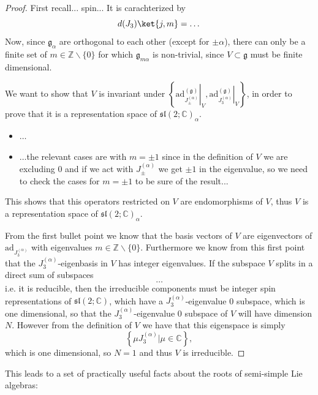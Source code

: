 \begin{proof}
    First recall... spin... It is carachterized by
    \[
        d(J_3)\ket{j,m} = \dots
    \]
    Now, since \(\mathfrak{g}_{\alpha}\) are orthogonal to each other (except for \(\pm \alpha\)), there can only be a finite set of \(m \in \mathbb{Z} \backslash \{0\}\) for which \(\mathfrak{g}_{m \alpha}\) is non-trivial, since \(V \subset \mathfrak{g}\) must be finite dimensional.

    We want to show that \(V\) is invariant under \(\left\{\left. \mathrm{ad}^{(\mathfrak{g})}_{J_\pm^{(\alpha)}}\right|_V , \left. \mathrm{ad}^{(\mathfrak{g})}_{J_3^{(\alpha)}}\right|_V \right\}\), in order to prove that it is a representation space of \(\mathfrak{sl}(2; \mathbb{C})_{\alpha}\).
    \begin{itemize}
        \item \(\dots \)
        \item \(\dots \)the relevant cases are with \(m=\pm 1\) since in the definition of \(V\) we are excluding \(0\) and if we act with \(J_\pm^{(\alpha)}\) we get \(\pm 1\) in the eigenvalue, so we need to check the cases for \(m = \pm 1\) to be sure of the result...
    \end{itemize}
    This shows that this operators restricted on \(V\) are endomorphisms of \(V\), thus \(V\) is a representation space of \(\mathfrak{sl}(2; \mathbb{C})_{\alpha}\).

    From the first bullet point we know that the basis vectors of \(V\) are eigenvectors of \(\mathrm{ad}_{J_3^{(\alpha)}}\) with eigenvalues \(m \in \mathbb{Z} \backslash \{0\}\). Furthermore we know from this first point that the \(J_3^{(\alpha)}\)-eigenbasis in \(V\) has integer eigenvalues. If the subspace \(V\) splits in a direct sum of subspaces
    \[
        \dots
    \]
    i.e. it is reducible, then the irreducible components must be integer spin representations of \(\mathfrak{sl}(2; \mathbb{C})\), which have a \(J_3^{(\alpha)}\)-eigenvalue 0 subspace, which is one dimensional, so that the \(J_3^{(\alpha)}\)-eigenvalue 0 subspace of \(V\) will have dimension \(N\). However from the definition of \(V\) we have that this eigenspace is simply
    \[
        \left\{ \mu J_3^{(\alpha)} \big | \mu \in \mathbb{C} \right\},
    \]
    which is one dimensional, so \(N = 1\) and thus \(V\) is irreducible.
\end{proof}

This leads to a set of practically useful facts about the roots of semi-simple Lie algebras:


